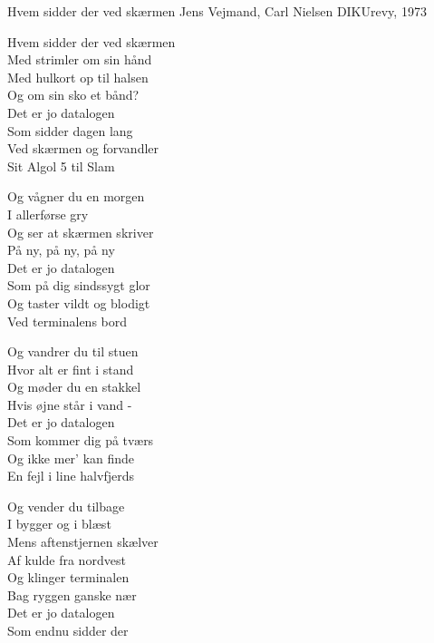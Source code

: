 \begin{song}{Hvem sidder der ved skærmen}
  {} %
  {Jens Vejmand, Carl Nielsen} %
  {} %
  {DIKUrevy, 1973} %
  {\NotCCLIed} %

  \begin{SBVerse}
    Hvem sidder der ved skærmen\\
    Med strimler om sin hånd\\
    Med hulkort op til halsen\\
    Og om sin sko et bånd?\\
    \medskip
    Det er jo datalogen\\
    Som sidder dagen lang\\
    Ved skærmen og forvandler\\
    Sit Algol 5 til Slam
  \end{SBVerse}

  \begin{SBVerse}
    Og vågner du en morgen\\
    I allerførse gry\\
    Og ser at skærmen skriver\\
    På ny, på ny, på ny\\
    \medskip
    Det er jo datalogen\\
    Som på dig sindssygt glor\\
    Og taster vildt og blodigt\\
    Ved terminalens bord
  \end{SBVerse}

  \begin{SBVerse}
    Og vandrer du til stuen\\
    Hvor alt er fint i stand\\
    Og møder du en stakkel\\
    Hvis øjne står i vand -\\
    \medskip
    Det er jo datalogen\\
    Som kommer dig på tværs\\
    Og ikke mer' kan finde\\
    En fejl i line halvfjerds
  \end{SBVerse}

  \begin{SBVerse}
    Og vender du tilbage\\
    I bygger og i blæst\\
    Mens aftenstjernen skælver\\
    Af kulde fra nordvest\\
    \medskip
    Og klinger terminalen\\
    Bag ryggen ganske nær\\
    Det er jo datalogen\\
    Som endnu sidder der
  \end{SBVerse}


\end{song}
